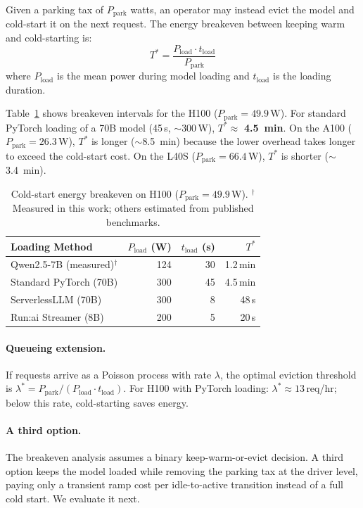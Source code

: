 \documentclass[sigconf,nonacm]{acmart}
\begin{document}
Given a parking tax of $P_{\text{park}}$ watts, an operator may instead evict the model and cold-start it on the next request. The energy breakeven between keeping warm and cold-starting is:
\begin{equation}
    T^* = \frac{P_{\text{load}} \cdot t_{\text{load}}}{P_{\text{park}}}
    \label{eq:breakeven}
\end{equation}
where $P_{\text{load}}$ is the mean power during model loading and $t_{\text{load}}$ is the loading duration.

Table~\ref{tab:breakeven} shows breakeven intervals for the H100 ($P_{\text{park}} = 49.9$\,W). For standard PyTorch loading of a 70B model (45\,s, $\sim$300\,W), $T^* \approx$ \textbf{4.5~min}. On the A100 ($P_{\text{park}} = 26.3$\,W), $T^*$ is longer ($\sim$8.5~min) because the lower overhead takes longer to exceed the cold-start cost. On the L40S ($P_{\text{park}} = 66.4$\,W), $T^*$ is shorter ($\sim$3.4~min).

\begin{table}[t]
\caption{Cold-start energy breakeven on H100 ($P_{\text{park}} = 49.9$\,W). $^\dagger$Measured in this work; others estimated from published benchmarks.}
\label{tab:breakeven}
\small
\begin{tabular}{lrrr}
\toprule
\textbf{Loading Method} & $P_{\text{load}}$ \textbf{(W)} & $t_{\text{load}}$ \textbf{(s)} & $T^*$ \\
\midrule
Qwen2.5-7B (measured)$^\dagger$ & 124 & 30 & 1.2\,min \\
Standard PyTorch (70B) & 300 & 45 & 4.5\,min \\
ServerlessLLM (70B) & 300 & 8 & 48\,s \\
Run:ai Streamer (8B) & 200 & 5 & 20\,s \\
\bottomrule
\end{tabular}
\end{table}

\paragraph{Queueing extension.} If requests arrive as a Poisson process with rate $\lambda$, the optimal eviction threshold is $\lambda^* = P_{\text{park}} / (P_{\text{load}} \cdot t_{\text{load}})$. For H100 with PyTorch loading: $\lambda^* \approx 13$\,req/hr; below this rate, cold-starting saves energy.

\paragraph{A third option.} The breakeven analysis assumes a binary keep-warm-or-evict decision. A third option keeps the model loaded while removing the parking tax at the driver level, paying only a transient ramp cost per idle-to-active transition instead of a full cold start. We evaluate it next.
\end{document}
